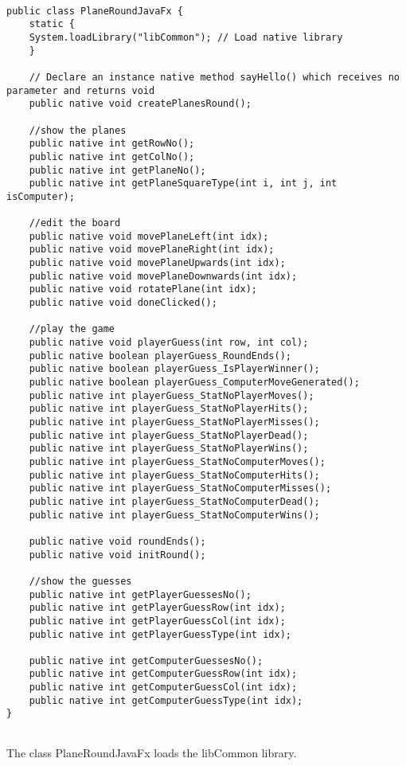 \begin{lstlisting} 

public class PlaneRoundJavaFx {
	static {
	System.loadLibrary("libCommon"); // Load native library 
	}
	
	// Declare an instance native method sayHello() which receives no parameter and returns void
	public native void createPlanesRound(); 
	
	//show the planes
	public native int getRowNo();
	public native int getColNo();
	public native int getPlaneNo();
	public native int getPlaneSquareType(int i, int j, int isComputer);
	
	//edit the board
	public native void movePlaneLeft(int idx);
	public native void movePlaneRight(int idx);
	public native void movePlaneUpwards(int idx);
	public native void movePlaneDownwards(int idx);
	public native void rotatePlane(int idx);
	public native void doneClicked();
	
	//play the game
	public native void playerGuess(int row, int col);
	public native boolean playerGuess_RoundEnds();
	public native boolean playerGuess_IsPlayerWinner();
	public native boolean playerGuess_ComputerMoveGenerated();
	public native int playerGuess_StatNoPlayerMoves();
	public native int playerGuess_StatNoPlayerHits();
	public native int playerGuess_StatNoPlayerMisses();
	public native int playerGuess_StatNoPlayerDead();
	public native int playerGuess_StatNoPlayerWins();
	public native int playerGuess_StatNoComputerMoves();
	public native int playerGuess_StatNoComputerHits();
	public native int playerGuess_StatNoComputerMisses();
	public native int playerGuess_StatNoComputerDead();
	public native int playerGuess_StatNoComputerWins();
	
	public native void roundEnds();
	public native void initRound();
	
	//show the guesses
	public native int getPlayerGuessesNo();
	public native int getPlayerGuessRow(int idx);
	public native int getPlayerGuessCol(int idx);
	public native int getPlayerGuessType(int idx);
	
	public native int getComputerGuessesNo();
	public native int getComputerGuessRow(int idx);
	public native int getComputerGuessCol(int idx);
	public native int getComputerGuessType(int idx);	
}


\end{lstlisting}

The class PlaneRoundJavaFx loads the libCommon library. 
